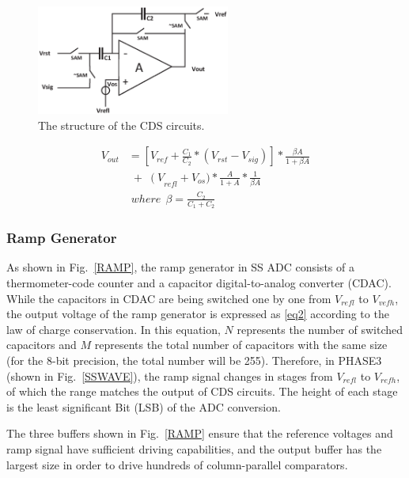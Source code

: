 \begin{figure}[htbp]
	\centerline{\includegraphics[width=2.5in]{./Figures/CDS.eps}}
	\caption{The structure of the CDS circuits.}
	\label{CDS}
\end{figure} 

\begin{equation}
	\begin{aligned}
		V_{out}&=\left[ V_{ref}+\frac{C_1}{C_2}\ast\left(V_{rst}-V_{sig}\right)\right]\ast\frac{\beta A}{1+\beta A}\\
		&\;{+}\;\left(V\right._{refl}+V_{os})\ast\frac{A}{1+A}\ast\frac{1}{\beta A}\\
		&\;where\ \ \beta=\frac{C_2}{C_1+C_2}
		\label{eq1}
	\end{aligned}
\end{equation}

\subsubsection{Ramp Generator}

As shown in Fig.~\ref{RAMP}, the ramp generator in SS ADC consists of a thermometer-code counter and a capacitor digital-to-analog converter (CDAC). 
While the capacitors in CDAC are being switched one by one from $V_{refl}$ to $V_{vefh}$, the output voltage of the ramp generator is expressed as \eqref{eq2} according to the law of charge conservation. 
In this equation, $N$ represents the number of switched capacitors and $M$ represents the total number of capacitors with the same size (for the 8-bit precision, the total number will be 255). 
Therefore, in PHASE3 (shown in Fig.~\ref{SSWAVE}), the ramp signal changes in stages from $V_{refl}$ to $V_{refh}$, of which the range matches the output of CDS circuits. 
The height of each stage is the least significant Bit (LSB) of the ADC conversion.

The three buffers shown in Fig.~\ref{RAMP} ensure that the reference voltages and ramp signal have sufficient driving capabilities, 
and the output buffer has the largest size in order to drive hundreds of column-parallel comparators.

